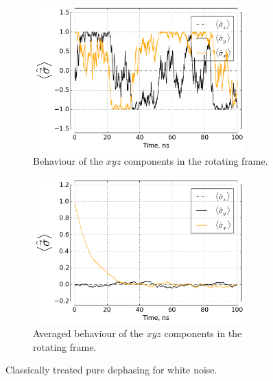 \documentclass[12pt]{report}
\numberwithin{equation}{section}
\begin{document}
\begin{figure}
\begin{subfigure}[t]{0.45\textwidth}
\centering
\includegraphics[width=0.9\textwidth]{cdeph_xyz_rf}
\caption{Behaviour of the $xyz$ components in the rotating frame.}
\end{subfigure}
\begin{subfigure}[t]{0.45\textwidth}
\centering
\includegraphics[width=0.9\textwidth]{cdeph_xyz_rf_avg}
\caption{Averaged behaviour of the $xyz$ components in the rotating frame.}
\end{subfigure}
\caption{Classically treated pure dephasing for white noise.}
\label{fig:cdeph}
\endgroup
\end{figure}
\end{document}

